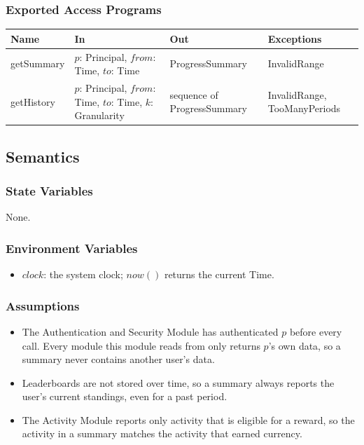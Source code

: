 \documentclass[12pt, titlepage]{article}
\begin{document}
\subsubsection{Exported Access Programs}

\begin{center}
\renewcommand{\arraystretch}{1.2}
\begin{tabular}{>{\raggedright\arraybackslash}p{2.6cm}
  >{\raggedright\arraybackslash}p{5.4cm}
  >{\raggedright\arraybackslash}p{3cm}
  >{\raggedright\arraybackslash}p{3cm}}
\toprule
\textbf{Name} & \textbf{In} & \textbf{Out} & \textbf{Exceptions} \\
\midrule
getSummary & $p$: Principal, $\mathit{from}$: Time, $\mathit{to}$: Time &
  ProgressSummary & InvalidRange \\
getHistory & $p$: Principal, $\mathit{from}$: Time, $\mathit{to}$: Time,
  $k$: Granularity & sequence of ProgressSummary & InvalidRange,
  TooManyPeriods \\
\bottomrule
\end{tabular}
\end{center}

\subsection{Semantics}

\subsubsection{State Variables}

None.

\subsubsection{Environment Variables}

\begin{itemize}
\item $\mathit{clock}$: the system clock; $\mathit{now}()$ returns the
  current Time.
\end{itemize}

\subsubsection{Assumptions}

\begin{itemize}
\item The Authentication and Security Module has authenticated $p$ before
  every call. Every module this module reads from only returns $p$'s own
  data, so a summary never contains another user's data.
\item Leaderboards are not stored over time, so a summary always reports
  the user's current standings, even for a past period.
\item The Activity Module reports only activity that is eligible for a
  reward, so the activity in a summary matches the activity that earned
  currency.
\end{itemize}
\end{document}
